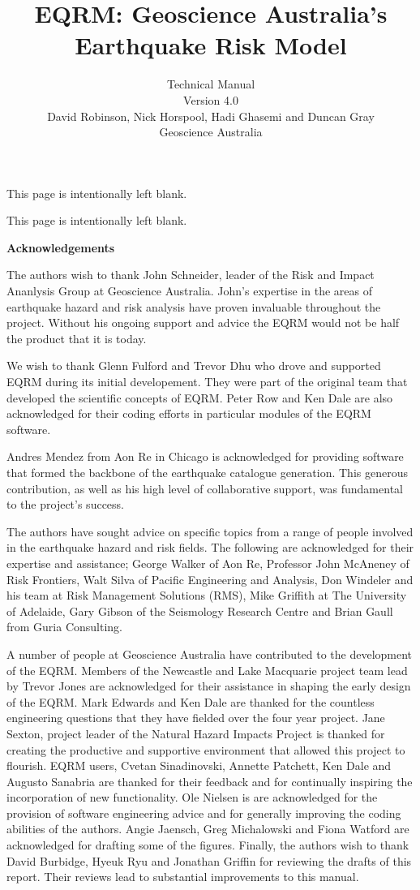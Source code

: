 \documentclass[a4paper, 12pt]{report}
\title{EQRM: Geoscience Australia's Earthquake Risk Model\\
}
\author{Technical Manual \\[1em]
Version 4.0 \\[3em]
David Robinson, Nick Horspool, Hadi Ghasemi and Duncan Gray\\[1em]
Geoscience Australia}
\begin{document}
\maketitle


This page is intentionally left blank. \newpage


This page is intentionally left blank.
\newpage

 {\Huge \textbf{Acknowledgements}  }

The authors wish to thank John Schneider, leader of the Risk
and Impact Ananlysis Group at Geoscience Australia. John's expertise in the
areas of earthquake hazard and risk analysis have proven
invaluable throughout the project. Without his ongoing support and
advice the EQRM would not be half the product that it is today.

We wish to thank Glenn Fulford and Trevor Dhu who drove and supported
EQRM during its initial developement.  They were part of the original
team that developed the scientific concepts of EQRM. Peter Row and Ken
Dale are also acknowledged for their coding efforts in particular
modules of the EQRM software.

Andres Mendez from Aon Re in Chicago is acknowledged for providing
software that formed the backbone of the earthquake catalogue
generation. This generous contribution, as well as his high level of
collaborative support, was fundamental to the project's success.

The authors have sought advice on specific topics from a range of
people involved in the earthquake hazard and risk fields. The
following are acknowledged for their expertise and assistance;
George Walker of Aon Re, Professor John McAneney of Risk
Frontiers, Walt Silva of Pacific Engineering and Analysis, Don
Windeler and his team at Risk Management Solutions (RMS), Mike
Griffith at The University of Adelaide, Gary Gibson of the
Seismology Research Centre and Brian Gaull from Guria Consulting.

A number of people at Geoscience Australia have contributed to the
development of the EQRM. Members of the Newcastle and Lake Macquarie
project team lead by Trevor Jones are acknowledged for their
assistance in shaping the early design of the EQRM. Mark Edwards and
Ken Dale are thanked for the countless engineering questions that they
have fielded over the four year project. Jane Sexton, project leader
of the Natural Hazard Impacts Project is thanked for creating the
productive and supportive environment that allowed this project to
flourish. EQRM users, Cvetan Sinadinovski, Annette Patchett, Ken Dale
and Augusto Sanabria are thanked for their feedback and for
continually inspiring the incorporation of new functionality. Ole
Nielsen is are acknowledged for the provision of software engineering
advice and for generally improving the coding abilities of the
authors. Angie Jaensch, Greg Michalowski and Fiona Watford are
acknowledged for drafting some of the figures.  Finally, the authors
wish to thank David Burbidge, Hyeuk Ryu and Jonathan Griffin for reviewing
the drafts of this report. Their reviews lead to substantial
improvements to this manual.
\end{document}

